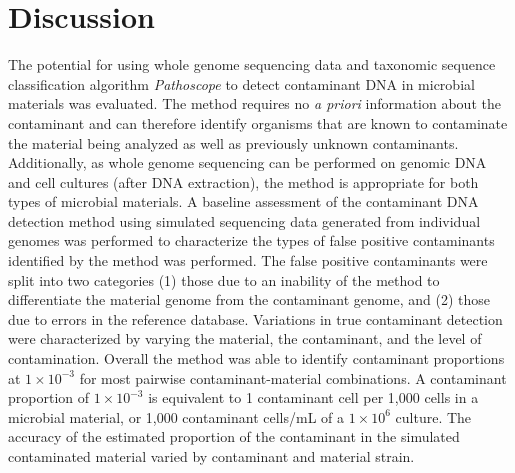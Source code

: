 \documentclass[fleqn,10pt,lineno]{wlpeerj}\usepackage[]{graphicx}\usepackage[]{color}
\begin{document}
\section*{Discussion}

The potential for using whole genome sequencing data and taxonomic sequence classification algorithm \textit{Pathoscope} to detect contaminant DNA in microbial materials was evaluated. 
The method requires no \textit{a priori} information about the contaminant and can therefore identify organisms that are known to contaminate the material being analyzed as well as previously unknown contaminants. 
Additionally, as whole genome sequencing can be performed on genomic DNA and cell cultures (after DNA extraction), the method is appropriate for both types of microbial materials.
A baseline assessment of the contaminant DNA detection method using simulated sequencing data generated from individual genomes was performed to characterize the types of false positive contaminants identified by the method was performed. 
The false positive contaminants were split into two categories (1) those due to an inability of the method to differentiate the material genome from the contaminant genome, and (2) those due to errors in the reference database. 
Variations in true contaminant detection were characterized by varying the material, the contaminant, and the level of contamination. 
Overall the method was able to identify contaminant proportions at $1 \times 10^{-3}$ for most pairwise contaminant-material combinations. 
A contaminant proportion of $1 \times 10^{-3}$ is equivalent to 1 contaminant cell per 1,000 cells in a microbial material, or 1,000 contaminant cells/mL of a $1 \times 10^{6}$ culture.
The accuracy of the estimated proportion of the contaminant in the simulated contaminated material varied by contaminant and material strain. 
\end{document}
